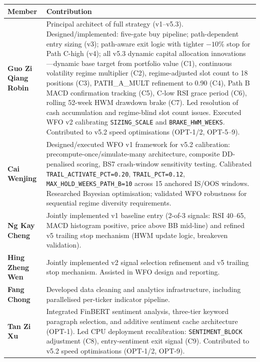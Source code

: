 \documentclass[11pt,twoside,a4paper]{article}
\begin{document}
{\small
\begin{tabular}{>{\raggedright\arraybackslash}p{3.8cm}%
                >{\raggedright\arraybackslash}p{10.5cm}}
\hline
Member & Contribution \\
\hline
\textbf{Guo Zi Qiang Robin} & Principal architect of full strategy (v1--v5.3). Designed/implemented: five-gate buy pipeline; path-dependent entry sizing (v3); path-aware exit logic with tighter $-10\%$ stop for Path C-high (v4); all v5.3 dynamic capital allocation innovations---dynamic base target from portfolio value (C1), continuous volatility regime multiplier (C2), regime-adjusted slot count to 18 positions (C3), PATH\_A\_MULT refinement to 0.90 (C4), Path B MACD confirmation tracking (C5), C-low RSI grace period (C6), rolling 52-week HWM drawdown brake (C7). Led resolution of cash accumulation and regime-blind slot count issues. Executed WFO v2 calibrating \texttt{SIZING\_SCALE} and \texttt{BRAKE\_HWM\_WEEKS}. Contributed to v5.2 speed optimisations (OPT-1/2, OPT-5--9). \\[4pt]
\textbf{Cai Wenjing} & Designed/executed WFO v1 framework for v5.2 calibration: precompute-once/simulate-many architecture, composite DD-penalised scoring, BS7 crash-window sensitivity testing. Calibrated \texttt{TRAIL\_ACTIVATE\_PCT=0.20}, \texttt{TRAIL\_PCT=0.12}, \texttt{MAX\_HOLD\_WEEKS\_PATH\_B=10} across 15 anchored IS/OOS windows. Researched Bayesian optimisation; validated WFO robustness for sequential regime diversity requirements. \\[4pt]
\textbf{Ng Kay Cheng} & Jointly implemented v1 baseline entry (2-of-3 signals: RSI 40--65, MACD histogram positive, price above BB mid-line) and refined v5 trailing stop mechanism (HWM update logic, breakeven validation). \\[4pt]
\textbf{Hing Zheng Wen} & Jointly implemented v2 signal selection refinement and v5 trailing stop mechanism. Assisted in WFO design and reporting. \\[4pt]
\textbf{Fang Chong} & Developed data cleaning and analytics infrastructure, including parallelised per-ticker indicator pipeline. \\[4pt]
\textbf{Tan Zi Xu} & Integrated FinBERT sentiment analysis, three-tier keyword paragraph selection, and additive sentiment cache architecture (OPT-1). Led CPU deployment recalibration: \texttt{SENTIMENT\_BLOCK} adjustment (C8), entry-sentiment exit signal (C9). Contributed to v5.2 speed optimisations (OPT-1/2, OPT-9). \\
\hline
\end{tabular}
}
\end{document}
